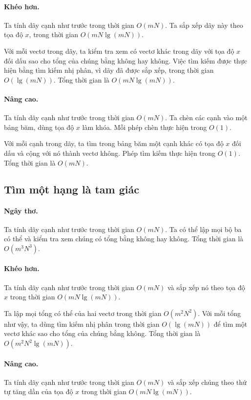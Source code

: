 \documentclass[11pt]{article}
\begin{document}
\paragraph{Khéo hơn.}
Ta tính dãy cạnh như trước trong thời gian \(O(mN)\). Ta sắp xếp dãy này theo
tọa độ \(x\), trong thời gian \(O(mN\lg(mN))\).

Với mỗi vectơ trong dãy, ta kiểm tra xem có vectơ khác trong dãy với tọa độ
\(x\) đối dấu sao cho tổng của chúng bằng không hay không. Việc tìm kiếm được
thực hiện bằng tìm kiếm nhị phân, vì dãy đã được sắp xếp, trong thời gian
\(O(\lg(mN))\). Tổng thời gian là \(O(mN\lg(mN))\).

\paragraph{Nâng cao.}
Ta tính dãy cạnh như trước trong thời gian \(O(mN)\). Ta chèn các cạnh vào một
bảng băm, dùng tọa độ \(x\) làm khóa. Mỗi phép chèn thực hiện trong \(O(1)\).

Với mỗi cạnh trong dãy, ta tìm trong bảng băm một cạnh khác có tọa độ \(x\) đối
dấu và cộng với nó thành vectơ không. Phép tìm kiếm thực hiện trong \(O(1)\).
Tổng thời gian là \(O(mN)\).

\subsection{Tìm một hạng là tam giác}

\paragraph{Ngây thơ.}
Ta tính dãy cạnh như trước trong thời gian \(O(mN)\). Ta có thể lập mọi bộ ba
có thể và kiểm tra xem chúng có tổng bằng không hay không. Tổng thời gian là
\(O(m^3N^3)\).

\paragraph{Khéo hơn.}
Ta tính dãy cạnh như trước trong thời gian \(O(mN)\) và sắp xếp nó theo tọa độ
\(x\) trong thời gian \(O(mN\lg(mN))\).

Ta lập mọi tổng có thể của hai vectơ trong thời gian \(O(m^2N^2)\). Với mỗi
tổng như vậy, ta dùng tìm kiếm nhị phân trong thời gian \(O(\lg(mN))\) để tìm
một vectơ khác sao cho tổng của chúng bằng không. Tổng thời gian là
\(O(m^2N^2\lg(mN))\).

\paragraph{Nâng cao.}
Ta tính dãy cạnh như trước trong thời gian \(O(mN)\) và sắp xếp chúng theo thứ
tự tăng dần của tọa độ \(x\) trong thời gian \(O(mN\lg(mN))\).
\end{document}
